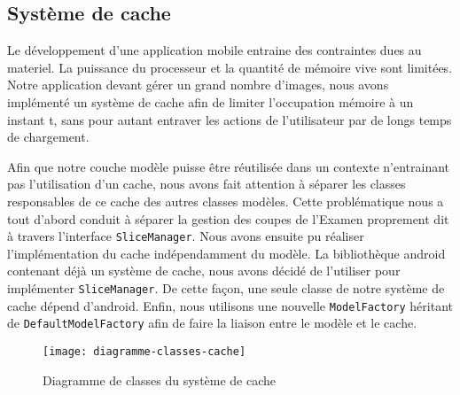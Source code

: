 \subsection{Système de cache}

Le développement d'une application mobile entraine des contraintes dues au materiel. La puissance du processeur et la quantité de mémoire vive sont limitées. Notre application devant gérer un grand nombre d'images, nous avons implémenté un système de cache afin de limiter l'occupation mémoire à un instant t, sans pour autant entraver les actions de l'utilisateur par de longs temps de chargement.

Afin que notre couche modèle puisse être réutilisée dans un contexte n'entrainant pas l'utilisation d'un cache, nous avons fait attention à séparer les classes responsables de ce cache des autres classes modèles. Cette problématique nous a tout d'abord conduit à séparer la gestion des coupes de l'Examen proprement dit à travers l'interface \verb+SliceManager+. Nous avons ensuite pu réaliser l'implémentation du cache indépendamment du modèle. La bibliothèque android contenant déjà un système de cache, nous avons décidé de l'utiliser pour implémenter \verb+SliceManager+. De cette façon, une seule classe de notre système de cache dépend d'android. Enfin, nous utilisons une nouvelle \verb+ModelFactory+ héritant de \verb+DefaultModelFactory+ afin de faire la liaison entre le modèle et le cache.

\begin{figure}[h]
\begin{center}
	\texttt{[image: diagramme-classes-cache]}
\end{center}
	\caption{Diagramme de classes du système de cache}
	\label{classes-cache}
\end{figure}